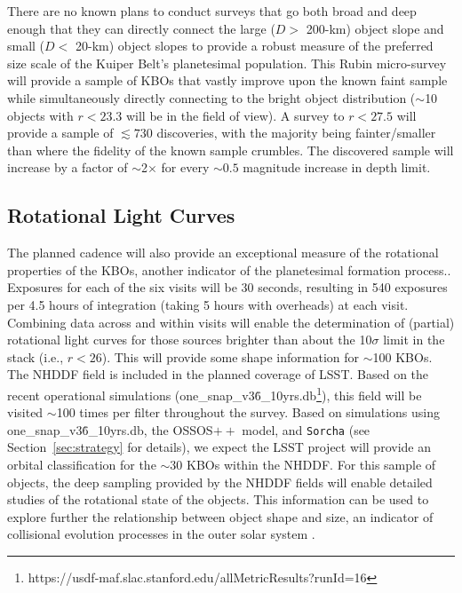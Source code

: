 \documentclass[modern,linenumbers,trackchanges,preprint]{aastex631}
\begin{document}
There are no known plans to conduct surveys that go both broad and deep enough that they can directly connect the large ($D>$ 200-km) object slope and small ($D<$ 20-km) object slopes to provide a robust measure of the preferred size scale of the Kuiper Belt's planetesimal population.
This Rubin micro-survey will provide a sample of KBOs that vastly improve upon the known faint sample while simultaneously directly connecting to the bright object distribution ($\sim$10 objects with $r<23.3$ will be in the field of view). A survey to $r<27.5$ will provide a sample of $\lesssim 730$ discoveries, with the majority being fainter/smaller than where the fidelity of the known sample crumbles. The discovered sample will increase by a factor of $\sim$2$\times$ for every $\sim0.5$ magnitude increase in depth limit. 

\subsection{Rotational Light Curves}
The planned cadence will also provide an exceptional measure of the rotational properties of the KBOs, another indicator of the planetesimal formation process..
Exposures for each of the six visits will be 30 seconds, resulting in 540 exposures per 4.5 hours of integration (taking 5 hours with overheads) at each visit.  
Combining data across and within visits will enable the determination of (partial) rotational light curves \citep[see][for example]{Strauss24} for those sources brighter than about the 10$\sigma$ limit in the stack (i.e., $r<26$).  
This will provide some shape information for $\sim$100 KBOs. 
The NHDDF field is included in the planned coverage of LSST. Based on the recent operational simulations (one\_snap\_v3\.6\_10yrs.db\footnote{https://usdf-maf.slac.stanford.edu/allMetricResults?runId=16}), this field will be visited $\sim$100 times per filter throughout the survey.  
Based on simulations using one\_snap\_v3\.6\_10yrs.db, the OSSOS$++$ model, and \texttt{Sorcha} (see Section~\ref{sec:strategy} for details), we expect the LSST project will provide an orbital classification for the $\sim30$ KBOs within the NHDDF.  
For this sample of objects, the deep sampling provided by the NHDDF fields will enable detailed studies of the rotational state of the objects. This information can be used to explore further the relationship between object shape and size, an indicator of collisional evolution processes in the outer solar system \citep{Benechhi13}.
\end{document}
